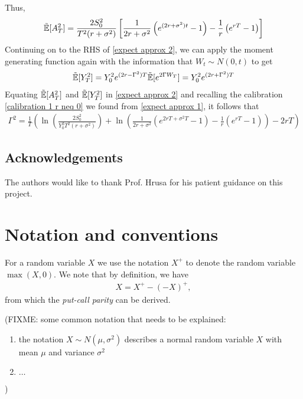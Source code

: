 \documentclass[reqno]{amsart}
\newcommand{\rE}[1]{\tilde{\E}[#1]}
\begin{document}
Thus,
\begin{align}
     \rE{A_T^2} =  
     \frac{2 S_0^2}{T^2(r + \sigma^2)} \left[ \frac{1}{2r+\sigma^2} \left( e^{(2r + \sigma^2)t} - 1 \right) - \frac{1}{r} \left( e^{rT} - 1 \right) \right]
\end{align}
Continuing on to the RHS of \eqref{expect approx 2}, we can apply the moment generating function again with the information that $W_t \sim N(0, t)$ to get
\begin{align}
     \rE{Y_T^2}
     = Y_0^2 e^{(2r-\Gamma^2)T} \rE{e^{2\Gamma W_T}}
     = Y_0^2 e^{(2r+\Gamma^2)T}
\end{align}
Equating $\rE{A_T^2}$ and $\rE{Y_T^2}$ in \eqref{expect approx 2} and recalling the calibration \eqref{calibration 1 r neq 0} we found from \eqref{expect approx 1}, it follows that
\begin{align}
     \Gamma^2
     = \frac{1}{T} \left( \ln{\left( \frac{2S_0^2}{Y_0^2 T^2 (r+\sigma^2)} \right)}+\ln{\left( \frac{1}{2r+\sigma^2} \left( e^{2rT+\sigma^2T} - 1 \right) -\frac{1}{r}(e^{rT}-1) \right)} -2rT \right)
\end{align}

\subsection*{Acknowledgements} The authors would like to thank Prof. Hrusa for his patient guidance on this project.  


\appendix

\section{Notation and conventions}

For a random variable $X$ we use the notation $X^+$ to denote the random variable $\max(X,0)$. We note that by definition, we have 
\begin{align}\label{eq: pos part decomp}
      X = X^+ - (-X)^+,
\end{align}
from which the \emph{put-call parity} can be derived. 

(FIXME: some common notation that needs to be explained: 
\begin{enumerate}
      \item the notation $X \sim N(\mu,\sigma^2)$ describes a normal random variable $X$ with mean $\mu$ and variance $\sigma^2$
      \item $\ldots$
\end{enumerate}
)
\end{document}

